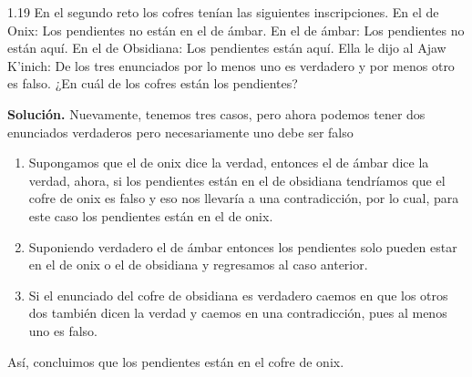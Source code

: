 1.19 En el segundo reto los cofres tenían las siguientes inscripciones. En el de Onix: Los pendientes no están en el de ámbar. En el de ámbar: Los pendientes no están aquí. En el de Obsidiana: Los pendientes están aquí. Ella le dijo al Ajaw K’inich: De los tres enunciados por lo menos uno es verdadero y por menos otro es falso. ¿En cuál de los cofres están los pendientes?

\textbf{Solución.} Nuevamente, tenemos tres casos, pero ahora podemos tener dos enunciados verdaderos pero necesariamente uno debe ser falso
\begin{enumerate}
    \item Supongamos que el de onix dice la verdad, entonces el de ámbar dice la verdad, ahora, si los pendientes están en el de obsidiana tendríamos que el cofre de onix es falso y eso nos llevaría a una contradicción, por lo cual, para este caso los pendientes están en el de onix.
    \item Suponiendo verdadero el de ámbar entonces los pendientes solo pueden estar en el de onix o el de obsidiana y regresamos al caso anterior.
    \item Si el enunciado del cofre de obsidiana es verdadero caemos en que los otros dos también dicen la verdad y caemos en una contradicción, pues al menos uno es falso.
\end{enumerate}

Así, concluimos que los pendientes están en el cofre de onix.